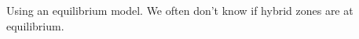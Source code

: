 \documentclass[12pt]{amsart}
\begin{document}
Using an equilibrium model. We often don't know if hybrid zones are at equilibrium. 




\end{document}
